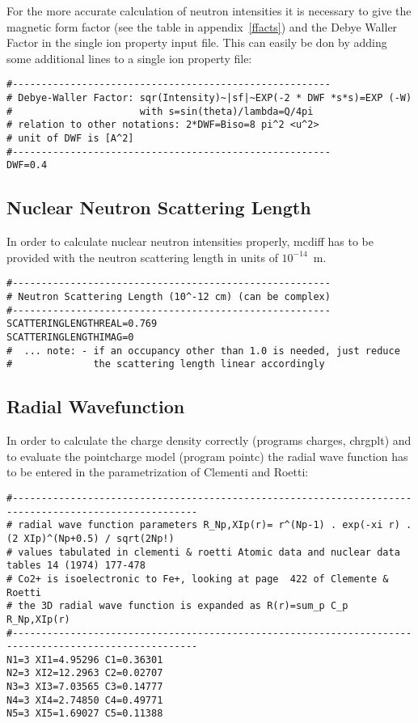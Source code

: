 For the more accurate calculation of neutron intensities it is
necessary to give the magnetic form factor (see the table in appendix~\ref{ffacts})
and the Debye Waller Factor in the single ion property input file. This can
easily be don by adding some additional lines to a single ion property file:
{\footnotesize
\begin{verbatim}
#-------------------------------------------------------
# Debye-Waller Factor: sqr(Intensity)~|sf|~EXP(-2 * DWF *s*s)=EXP (-W)
#                      with s=sin(theta)/lambda=Q/4pi
# relation to other notations: 2*DWF=Biso=8 pi^2 <u^2>
# unit of DWF is [A^2]
#-------------------------------------------------------
DWF=0.4
\end{verbatim}
}

\subsection{Nuclear Neutron Scattering Length}

In order to calculate nuclear neutron intensities properly, {\prg mcdiff} has to
be provided with the neutron scattering length in units of $10^{-14}$~m.
{\footnotesize
\begin{verbatim}
#-------------------------------------------------------
# Neutron Scattering Length (10^-12 cm) (can be complex)
#-------------------------------------------------------
SCATTERINGLENGTHREAL=0.769
SCATTERINGLENGTHIMAG=0
#  ... note: - if an occupancy other than 1.0 is needed, just reduce 
#              the scattering length linear accordingly
\end{verbatim}
}

\subsection{Radial Wavefunction}

In order to calculate the charge density correctly (programs {\prg charges, chrgplt}) and
to evaluate the pointcharge model (program {\prg pointc}) the radial wave function has to be entered in the %
parametrization of Clementi and Roetti:
{\footnotesize
\begin{verbatim}
#------------------------------------------------------------------------------------------------------
# radial wave function parameters R_Np,XIp(r)= r^(Np-1) . exp(-xi r) . (2 XIp)^(Np+0.5) / sqrt(2Np!)  
# values tabulated in clementi & roetti Atomic data and nuclear data tables 14 (1974) 177-478
# Co2+ is isoelectronic to Fe+, looking at page  422 of Clemente & Roetti 
# the 3D radial wave function is expanded as R(r)=sum_p C_p R_Np,XIp(r)
#------------------------------------------------------------------------------------------------------
N1=3 XI1=4.95296 C1=0.36301 
N2=3 XI2=12.2963 C2=0.02707 
N3=3 XI3=7.03565 C3=0.14777
N4=3 XI4=2.74850 C4=0.49771 
N5=3 XI5=1.69027 C5=0.11388 
\end{verbatim}
}
